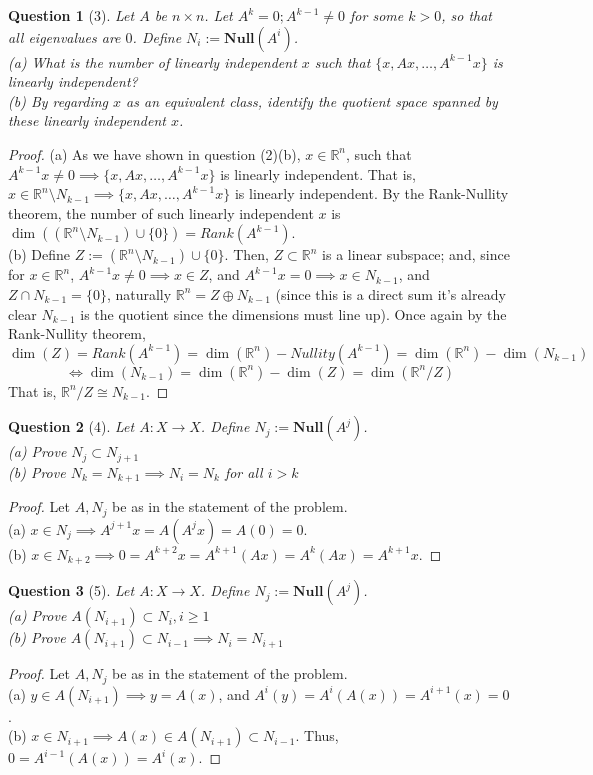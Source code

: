 \documentclass[11pt]{article}
\theoremstyle{quest}
\newtheorem*{question}{Question}
\begin{document}
\begin{question}[3]
Let $A$ be $n \times n$. Let $A^k = 0; A^{k-1} \ne 0$ for some $k > 0$, so that all eigenvalues are $0$. Define $N_i := \mathbf{Null}(A^i)$.
\\(a) What is the number of linearly independent $x$ such that $\{x, Ax, \ldots, A^{k-1}x\}$ is linearly independent?
\\(b) By regarding $x$ as an equivalent class, identify the quotient space spanned by these linearly independent $x$. 
\end{question}
\begin{proof}
(a) As we have shown in question (2)(b), $x \in \mathbb{R}^n$, such that $A^{k-1} x \ne 0 \implies \{x, Ax, \ldots, A^{k-1}x\}$ is linearly independent. That is, $x \in \mathbb{R}^n \setminus N_{k-1} \implies \{x, Ax, \ldots, A^{k-1}x\}$ is linearly independent. By the Rank-Nullity theorem, the number of such linearly independent $x$ is $\dim((\mathbb{R}^n \setminus N_{k-1}) \cup \{0\}) = Rank(A^{k-1})$.
\\(b) Define $Z := (\mathbb{R}^n \setminus N_{k-1}) \cup \{0\}$. Then, $Z \subset \mathbb{R}^n$ is a linear subspace; and, since for $x \in \mathbb{R}^n$, $A^{k-1}x \ne 0 \implies x \in Z$, and $A^{k-1}x = 0 \implies x \in N_{k-1}$, and $Z \cap N_{k-1} = \{0\}$, naturally $\mathbb{R}^n = Z \oplus N_{k-1}$ (since this is a direct sum it's already clear $N_{k-1}$ is the quotient since the dimensions must line up). Once again by the Rank-Nullity theorem, $$\dim(Z) = Rank(A^{k-1}) = \dim(\mathbb{R}^n) - Nullity(A^{k-1}) = \dim(\mathbb{R}^n) - \dim(N_{k-1})$$
$$\iff \dim(N_{k-1}) = \dim(\mathbb{R}^n) - \dim(Z) = \dim(\mathbb{R}^n / Z)$$
That is, $\mathbb{R}^n / Z \cong N_{k-1}$.
\end{proof}
\begin{question}[4]
Let $A: X \rightarrow X$. Define $N_j := \mathbf{Null}(A^j)$.
\\(a) Prove $N_j \subset N_{j+1}$
\\(b) Prove $N_k = N_{k+1} \implies N_i = N_k$ for all $i > k$
\end{question}
\begin{proof}
  Let $A, N_j$ be as in the statement of the problem.
  \\(a) $x \in N_j \implies A^{j+1}x = A(A^j x) = A(0) = 0$.
  \\(b) $x \in N_{k+2} \implies 0 = A^{k+2}x = A^{k+1}(Ax) = A^k(Ax) = A^{k+1}x$.
\end{proof}
\begin{question}[5]
Let $A: X \rightarrow X$. Define $N_j := \mathbf{Null}(A^j)$.
\\(a) Prove $A(N_{i+1}) \subset N_i, i \ge 1$
\\(b) Prove $A(N_{i+1}) \subset N_{i-1} \implies N_i = N_{i+1}$
\end{question}
\begin{proof}
Let $A, N_j$ be as in the statement of the problem.
  \\(a) $y \in A(N_{i+1}) \implies y = A(x)$, and $A^i(y) = A^i(A(x)) = A^{i+1}(x) = 0$.
  \\(b) $x \in N_{i+1} \implies A(x) \in A(N_{i+1}) \subset N_{i-1}$. Thus, $0 = A^{i-1}(A(x)) = A^i(x)$.
\end{proof}
\end{document}
